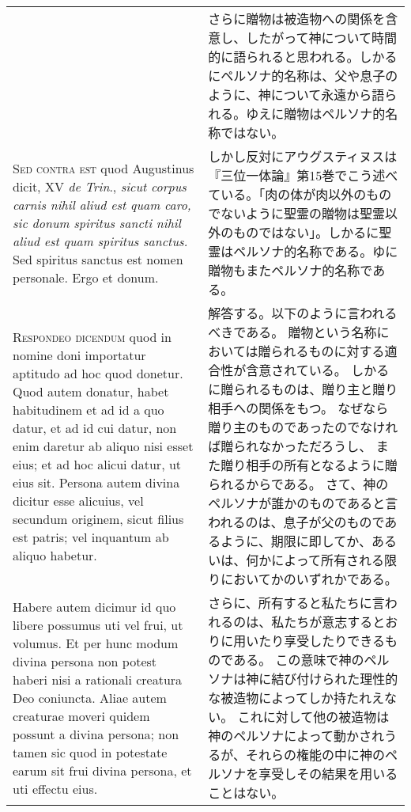 \documentclass[10pt]{jsarticle} %
\begin{document}
\begin{longtable}{p{21em}p{21em}}
&

さらに贈物は被造物への関係を含意し、したがって神について時間的に語られると思われる。しかるにペルソナ的名称は、父や息子のように、神について永遠から語られる。ゆえに贈物はペルソナ的名称ではない。

\\

\textsc{Sed contra est} quod Augustinus dicit, XV \textit{de Trin}., \textit{sicut corpus carnis nihil aliud est quam caro, sic donum spiritus sancti nihil aliud est quam spiritus sanctus.} Sed spiritus sanctus est nomen personale. Ergo et donum.


&

しかし反対にアウグスティヌスは『三位一体論』第15巻でこう述べている。「肉の体が肉以外のものでないように聖霊の贈物は聖霊以外のものではない」。しかるに聖霊はペルソナ的名称である。ゆに贈物もまたペルソナ的名称である。

\\

\textsc{Respondeo dicendum} quod in nomine doni importatur aptitudo ad hoc quod donetur.
Quod autem donatur, habet habitudinem et ad id a quo datur, et ad id cui datur,
non enim daretur ab aliquo nisi esset eius; et ad hoc alicui datur, ut eius
sit. Persona autem divina dicitur esse alicuius, vel secundum originem, sicut
filius est patris; vel inquantum ab aliquo habetur. 


&

解答する。以下のように言われるべきである。
贈物という名称においては贈られるものに対する適合性が含意されている。
しかるに贈られるものは、贈り主と贈り相手への関係をもつ。
なぜなら贈り主のものであったのでなければ贈られなかっただろうし、
また贈り相手の所有となるように贈られるからである。
さて、神のペルソナが誰かのものであると言われるのは、息子が父のものであるように、期限に即してか、あるいは、何かによって所有される限りにおいてかのいずれかである。

\\

Habere autem dicimur id quo
libere possumus uti vel frui, ut volumus. Et per hunc modum divina persona non
potest haberi nisi a rationali creatura Deo coniuncta. Aliae autem creaturae
moveri quidem possunt a divina persona; non tamen sic quod in potestate earum
sit frui divina persona, et uti effectu eius. 


&

さらに、所有すると私たちに言われるのは、私たちが意志するとおりに用いたり享受したりできるものである。
この意味で神のペルソナは神に結び付けられた理性的な被造物によってしか持たれえない。
これに対して他の被造物は神のペルソナによって動かされうるが、それらの権能の中に神のペルソナを享受しその結果を用いることはない。


\end{longtable}
\end{document}
